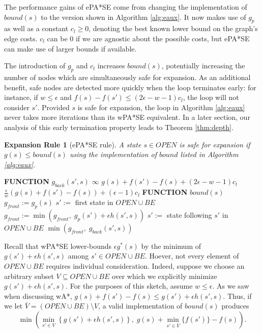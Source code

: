 \documentclass[letterpaper]{article}
\newtheorem{rul}{Expansion Rule}
\begin{document}
The performance gains of ePA*SE come from changing the implementation of $bound(s)$ to the version shown in Algorithm \ref{alg:eaux}. It now makes use of $g_p$ as well as a constant $c_l \ge 0$, denoting the best known lower bound on the graph's edge costs. $c_l$ can be 0 if we are agnostic about the possible costs, but ePA*SE can make use of larger bounds if available.

The introduction of $g_p$ and $c_l$ increases $bound(s)$, potentially increasing the number of nodes which are simultaneously safe for expansion. As an additional benefit, safe nodes are detected more quickly when the loop terminates early: for instance, if $w \le \epsilon$ and $f(s) - f(s') \le (2\epsilon-w-1)c_l$, the loop will not consider $s'$. Provided $s$ is safe for expansion, the loop in Algorithm \ref{alg:eaux} never takes more iterations than its wPA*SE equivalent. In a later section, our analysis of this early termination property leads to Theorem \ref{thm:depth}.

\begin{rul}[ePA*SE rule]
A state $s\in OPEN$ is safe for expansion if $g(s) \le bound(s)$ using the implementation of $bound$ listed in Algorithm \ref{alg:eaux}.
\end{rul}

\begin{algorithm}
\caption{$bound(s)$ enhanced for ePA*SE}
\label{alg:eaux}
\begin{algorithmic}
\STATE \textbf{FUNCTION} $g_{back}(s',s)$
\RETURN $\infty$
\RETURN $g(s) + f(s') - f(s) + (2\epsilon-w-1)c_l$
\ELSE
\RETURN $\frac\epsilon w\left(g(s) + f(s') - f(s)\right) + (\epsilon-1)c_l$
\ENDIF
\STATE \textbf{FUNCTION} $bound(s)$
\STATE $g_{front} := g_p(s)$
\STATE $s' :=$ first state in $OPEN \cup BE$
\STATE $g_{front} := \min(g_{front},\;g_p(s') + \epsilon h(s',s))$
\STATE $s' :=$ state following $s'$ in $OPEN \cup BE$
\ENDWHILE
\RETURN $\min(g_{front},\;g_{back}(s',s))$
\end{algorithmic}
\end{algorithm}

Recall that wPA*SE lower-bounds $\epsilon g^*(s)$ by the minimum of $g(s') + \epsilon h(s',s)$ among $s'\in OPEN\cup BE$. Hoever, not every element of $OPEN\cup BE$ requires individual consideration. Indeed, suppose we choose an arbitrary subset $V\subseteq OPEN\cup BE$ over which we explicitly minimize $g(s') + \epsilon h(s',s)$. For the purposes of this sketch, assume $w\le\epsilon$. As we saw when discussing wA*, $g(s) + f(s') - f(s) \le g(s') + \epsilon h(s',s)$. Thus, if we let $\bar V = (OPEN\cup BE)\setminus V$, a valid implementation of $bound(s)$ produces 
\[\min\left(\min_{s'\in V}\left\{g(s') + \epsilon h(s',s)\right\},\;g(s) + \min_{s'\in\bar V} \{f(s')\} - f(s)  \right).\]
\end{document}
